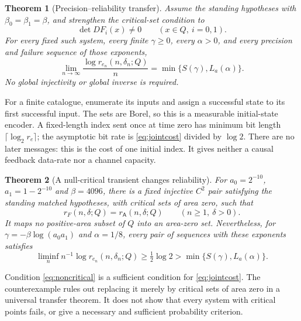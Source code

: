 \documentclass[11pt]{amsart}
\newtheorem{theorem}{Theorem}[section]
\theoremstyle{definition}
\theoremstyle{remark}
\numberwithin{equation}{section}
\begin{document}
\begin{theorem}[Precision--reliability transfer]\label{thm:reliability}
Assume the standing hypotheses with $\beta_0=\beta_1=\beta$,
and strengthen the critical-set condition to
\begin{equation}\label{eq:noncritical}
\det DF_i(x)\ne0\qquad(x\in Q,\ i=0,1).
\end{equation}
For every fixed such system, every finite $\gamma\ge0$, every
$\alpha>0$, and every precision and failure sequence of those
exponents,
\begin{equation}\label{eq:jointcost}
\lim_{n\to\infty}\frac{\log r_{e_n}(n,\delta_n;Q)}{n}
                   =\min\{S(\gamma),L_a(\alpha)\}.
\end{equation}
No global injectivity or global inverse is required.
\end{theorem}

For a finite catalogue, enumerate its inputs and assign a successful
state to its first successful input. The sets are Borel, so this is a
measurable initial-state encoder. A fixed-length index sent once at
time zero has minimum bit length $\lceil\log_2 r_e\rceil$; the
asymptotic bit rate is \eqref{eq:jointcost} divided by $\log2$.
There are no later messages: this is the cost of one initial index.
It gives neither a causal feedback data-rate nor a channel capacity.

\begin{theorem}[A null-critical transient changes reliability]
\label{thm:counter}
For $a_0=2^{-10}$, $a_1=1-2^{-10}$ and $\beta=4096$,
there is a fixed injective $C^2$ pair satisfying the standing
matched hypotheses, with critical sets of area zero, such that
\begin{equation}\label{eq:counterfull}
r_F(n,\delta;Q)=r_{\mathsf A}(n,\delta;Q)
                 \qquad(n\ge1,\ \delta>0).
\end{equation}
It maps no positive-area subset of $Q$ into an area-zero set.
Nevertheless, for $\gamma=-\beta\log(a_0a_1)$ and $\alpha=1/8$,
every pair of sequences with these exponents satisfies
\begin{equation}\label{eq:counterrate}
\liminf_n n^{-1}\log r_{e_n}(n,\delta_n;Q)
\ge\tfrac12\log2>\min\{S(\gamma),L_a(\alpha)\}.
\end{equation}
\end{theorem}

Condition \eqref{eq:noncritical} is a sufficient condition for
\eqref{eq:jointcost}. The counterexample rules out replacing it
merely by critical sets of area zero in a universal transfer theorem.
It does not show that every system with critical points fails,
or give a necessary and sufficient probability criterion.
\end{document}
